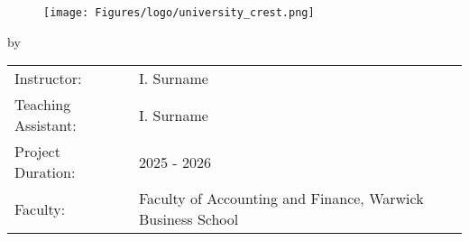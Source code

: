 \begin{titlepage}

\begin{center}

\begin{figure}[H]
    \centering
    \texttt{[image: Figures/logo/university\_crest.png]}
\end{figure}

\vfill

{\makeatletter
\largetitlestyle\fontsize{38}{38}\selectfont\@title
\makeatother}

{\makeatletter
\ifdefvoid{\@subtitle}{}{\bigskip\titlestyle\fontsize{20}{20}\selectfont\@subtitle}
\makeatother}

\bigskip
\bigskip

by

\bigskip
\bigskip

{\makeatletter
\largetitlestyle\fontsize{25}{25}\selectfont\@author
\makeatother}

\bigskip
\bigskip

\begin{tabular}{ll}
    Instructor: & I. Surname \\
    Teaching Assistant: & I. Surname \\
    Project Duration: & 2025 - 2026 \\
    Faculty: & Faculty of Accounting and Finance, Warwick Business School
\end{tabular}

\bigskip
\bigskip
\vfill

\end{center}


\end{titlepage}
